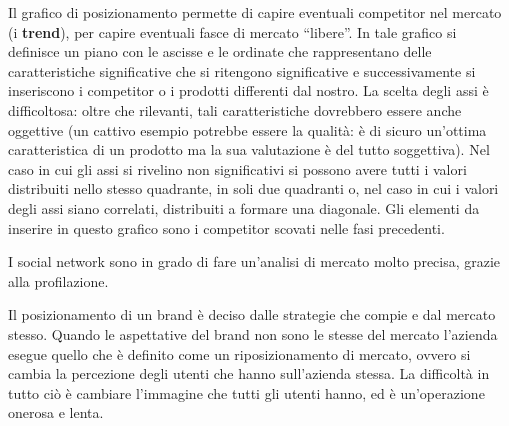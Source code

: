 Il grafico di posizionamento permette di capire eventuali competitor nel
mercato (i \textbf{trend}), per capire eventuali fasce di mercato ``libere''.
In tale grafico si definisce un piano con le ascisse e le ordinate che
rappresentano delle caratteristiche significative che si ritengono
significative e successivamente si inseriscono i competitor o i prodotti
differenti dal nostro. La scelta degli assi è difficoltosa: oltre che
rilevanti, tali caratteristiche dovrebbero essere anche oggettive (un cattivo
esempio potrebbe essere la qualità: è di sicuro un'ottima caratteristica di un
prodotto ma la sua valutazione è del tutto soggettiva). Nel caso in cui gli
assi si rivelino non significativi si possono avere tutti i valori distribuiti
nello stesso quadrante, in soli due quadranti o, nel caso in cui i valori degli
assi siano correlati, distribuiti a formare una diagonale. Gli elementi da
inserire in questo grafico sono i competitor scovati nelle fasi precedenti.


I social network sono in grado di fare un'analisi di mercato molto precisa,
grazie alla profilazione.

Il posizionamento di un brand è deciso dalle strategie che compie e dal mercato
stesso. Quando le aspettative del brand non sono le stesse del mercato
l'azienda esegue quello che è definito come un riposizionamento di mercato,
ovvero si cambia la percezione degli utenti che hanno sull'azienda stessa. La
difficoltà in tutto ciò è cambiare l'immagine che tutti gli utenti hanno, ed è
un'operazione onerosa e lenta.